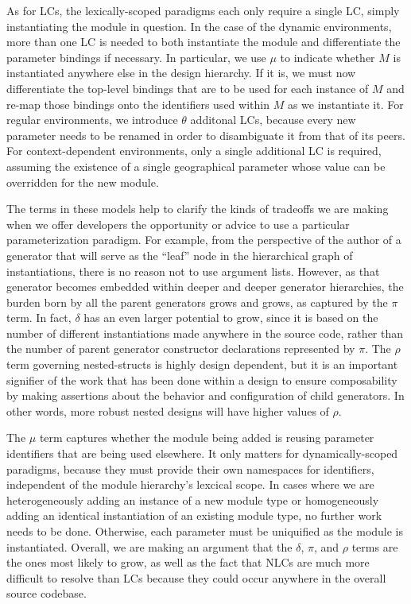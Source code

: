 As for LCs, the lexically-scoped paradigms each only require a single LC, simply instantiating the module in question.
In the case of the dynamic environments, more than one LC is needed to both instantiate the module and differentiate the parameter bindings if necessary.
In particular, we use $\mu$ to indicate whether $M$ is instantiated anywhere else in the design hierarchy.
If it is, we must now differentiate the top-level bindings that are to be used for each instance of $M$
and re-map those bindings onto the identifiers used within $M$ as we instantiate it.
For regular environments, we introduce $\theta$ additonal LCs, because every new parameter needs to be renamed in order to disambiguate it from that of its peers.
For context-dependent environments, only a single additional LC is required, assuming the existence of a single geographical parameter whose value can be overridden for the new module.

The terms in these models help to clarify the kinds of tradeoffs we are making when we offer developers the opportunity or advice to use a particular parameterization paradigm.
For example, from the perspective of the author of a generator that will serve as the ``leaf'' node in the hierarchical graph of instantiations, there is no reason not to use argument lists.
However, as that generator becomes embedded within deeper and deeper generator hierarchies, the burden born by all the parent generators grows and grows, as captured by the $\pi$ term.
In fact, $\delta$ has an even larger potential to grow, since it is based on the number of different instantiations made anywhere in the source code,
rather than the number of parent generator constructor declarations represented by $\pi$.
The $\rho$ term governing nested-structs is highly design dependent, but it is an important signifier of the work that has been done within a design to ensure composability
by making assertions about the behavior and configuration of child generators.
In other words, more robust nested designs will have higher values of $\rho$.


The $\mu$ term captures whether the module being added is reusing parameter identifiers that are being used elsewhere.
It only matters for dynamically-scoped paradigms, because they must provide their own namespaces for identifiers, independent of the module hierarchy's lexcical scope.
In cases where we are heterogeneously adding an instance of a new module type or homogeneously adding an identical instantiation of an existing module type, no further work needs to be done.
Otherwise, each parameter must be uniquified as the module is instantiated.
Overall, we are making an argument that the $\delta$, $\pi$, and $\rho$ terms are the ones most likely to grow,
as well as the fact that NLCs are much more difficult to resolve than LCs because they could occur anywhere in the overall source codebase.


